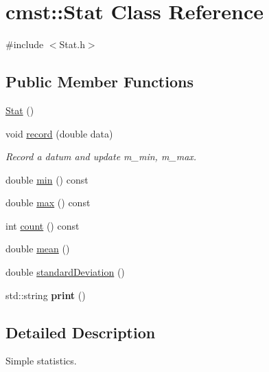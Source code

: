 \hypertarget{classcmst_1_1_stat}{}\section{cmst\+:\+:Stat Class Reference}
\label{classcmst_1_1_stat}


{\ttfamily \#include $<$Stat.\+h$>$}

\subsection*{Public Member Functions}
\begin{DoxyCompactItemize}
\item 
\hyperlink{classcmst_1_1_stat_a1f07a880a815c7efe4e4d244fb0c6b7d}{Stat} ()
\item 
void \hyperlink{classcmst_1_1_stat_ab1e2fe7c367da505a6b5f1fb5eb619d2}{record} (double data)\hypertarget{classcmst_1_1_stat_ab1e2fe7c367da505a6b5f1fb5eb619d2}{}\label{classcmst_1_1_stat_ab1e2fe7c367da505a6b5f1fb5eb619d2}

\begin{DoxyCompactList}\small\item\em Record a datum and update m\+\_\+min, m\+\_\+max. \end{DoxyCompactList}\item 
double \hyperlink{classcmst_1_1_stat_a1a6a92dee526145fb289d79a94afe3ae}{min} () const 
\item 
double \hyperlink{classcmst_1_1_stat_ab42898f6611aa9f1ad028f99c3d4242a}{max} () const 
\item 
int \hyperlink{classcmst_1_1_stat_ab8c6707fa4739fda8b27a2481df25c35}{count} () const 
\item 
double \hyperlink{classcmst_1_1_stat_aa40d8d516e7f866146d91866d63faf2b}{mean} ()
\item 
double \hyperlink{classcmst_1_1_stat_abfbaefc3a4174643a2eb282251fd86a5}{standard\+Deviation} ()
\item 
std\+::string {\bfseries print} ()\hypertarget{classcmst_1_1_stat_a03d1a0f52e2ea72cfab11a426726aea4}{}\label{classcmst_1_1_stat_a03d1a0f52e2ea72cfab11a426726aea4}

\end{DoxyCompactItemize}


\subsection{Detailed Description}
Simple statistics.

